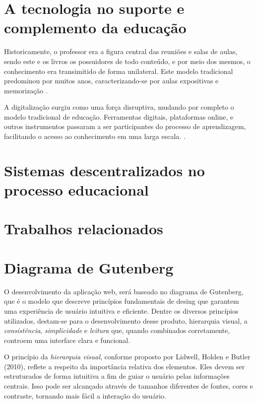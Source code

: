 \section{A tecnologia no suporte e complemento da educação}

Historicamente, o professor era a figura central das reuniões e salas de aulas, sendo este e os livros os possuidores de todo conteúdo, e por meio dos mesmos, o conhecimento era transimitido de forma unilateral. Este modelo tradicional predominou por muitos anos, caracterizando-se por aulas expositivas e memorização \cite{unicep2024}.

A digitalização surgiu como uma força disruptiva, mudando por completo o modelo tradicional de educação. Ferramentas digitais, plataformas online, e outros instrumentos passaram a ser participantes do processo de aprendizagem, facilitando o acesso ao conhecimento em uma larga escala. \cite{unicep2024}.

\section{Sistemas descentralizados no processo educacional}


\section{Trabalhos relacionados}

\section{Diagrama de Gutenberg}

O desenvolvimento da aplicação web, será baseado no diagrama de Gutenberg, que é o modelo que descreve princípios fundamentais de desing que garantem uma experiência de usuário intuitiva e eficiente. Dentre os diversos princípios utilizados, destam-se para o desenvolvimento desse produto, {hierarquia visual}, a \textit{consistência}, \textit{simplicidade} e \textit{leitura} que, quando combinados corretamente, controem uma interface clara e funcional.

O princípio da \textit{hierarquia visual}, conforme proposto por Lidwell, Holden e Butler (2010), reflete a respeito da importância relativa dos elementos. Eles devem ser estruturados de forma intuitiva a fim de guiar o usuário pelas informações centrais. Isso pode ser alcançado através de tamanhos diferentes de fontes, cores  e contraste, tornando mais fácil a interação do usuário.

